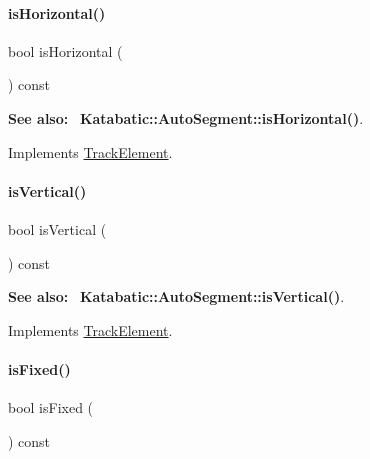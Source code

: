 \paragraph{\texorpdfstring{is\+Horizontal()}{isHorizontal()}}
{\footnotesize\ttfamily bool is\+Horizontal (\begin{DoxyParamCaption}{ }\end{DoxyParamCaption}) const\hspace{0.3cm}{\ttfamily [virtual]}}

{\bfseries See also\+:}~ \textbf{ Katabatic\+::\+Auto\+Segment\+::is\+Horizontal()}. 

Implements \hyperlink{classKite_1_1TrackElement_a9d3db1f8a5aca58f8f54d291faebf873}{Track\+Element}.

\mbox{\label{classKite_1_1TrackFixedSegment_abd54544ef1710ee4b67cfb021d73446c}} 
\paragraph{\texorpdfstring{is\+Vertical()}{isVertical()}}
{\footnotesize\ttfamily bool is\+Vertical (\begin{DoxyParamCaption}{ }\end{DoxyParamCaption}) const\hspace{0.3cm}{\ttfamily [virtual]}}

{\bfseries See also\+:}~ \textbf{ Katabatic\+::\+Auto\+Segment\+::is\+Vertical()}. 

Implements \hyperlink{classKite_1_1TrackElement_a6fa2bf0568a2b295dd7cd1f7207247d5}{Track\+Element}.

\mbox{\label{classKite_1_1TrackFixedSegment_afd7362b850709bed8b61c1aa22399f97}} 
\paragraph{\texorpdfstring{is\+Fixed()}{isFixed()}}
{\footnotesize\ttfamily bool is\+Fixed (\begin{DoxyParamCaption}{ }\end{DoxyParamCaption}) const\hspace{0.3cm}{\ttfamily [virtual]}}

